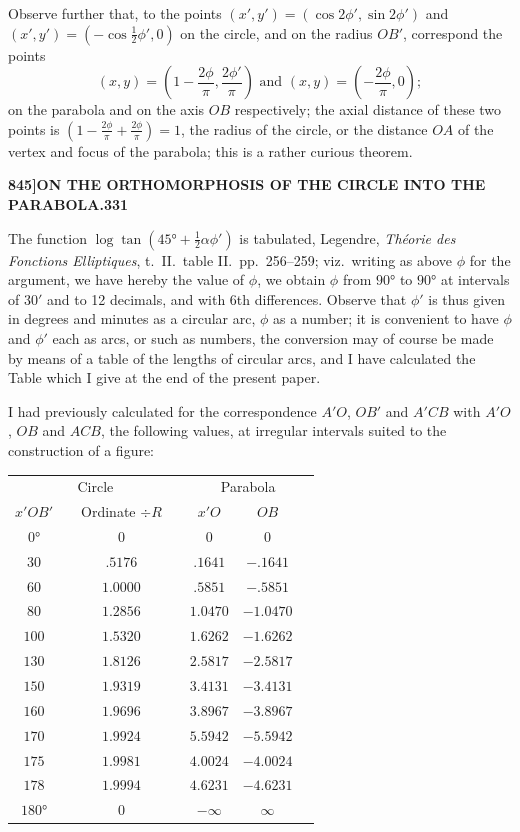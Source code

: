 \documentclass[11pt,a4paper]{book}
\begin{document}
Observe further that, to the points $(x', y') = (\cos 2\phi', \sin 2\phi')$ and $(x', y') = (-\cos\tfrac{1}{2}\phi', 0)$ on the circle, and on the radius $OB'$, correspond the points
\[
(x, y) = \left(1 - \frac{2\phi}{\pi}, \frac{2\phi'}{\pi}\right) \text{ and } (x, y) = \left(-\frac{2\phi}{\pi}, 0\right);
\]
on the parabola and on the axis $OB$ respectively; the axial distance of these two points is $\left(1 - \frac{2\phi}{\pi} + \frac{2\phi}{\pi}\right) = 1$, the radius of the circle, or the distance $OA$ of the vertex and focus of the parabola; this is a rather curious theorem.

\newpage
\setcounter{page}{331}

\noindent\textbf{845]}\hfill\textbf{ON THE ORTHOMORPHOSIS OF THE CIRCLE INTO THE PARABOLA.}\hfill\textbf{331}

\bigskip

\noindent The function $\log\tan(45° + \tfrac{1}{2}\alpha\phi')$ is tabulated, Legendre, \textit{Th\'eorie des Fonctions Elliptiques}, t.\ II.\ table II.\ pp.\ 256--259; viz.\ writing as above $\phi$ for the argument, we have hereby the value of $\phi$, we obtain $\phi$ from $90°$ to $90°$ at intervals of $30'$ and to 12 decimals, and with 6th differences. Observe that $\phi'$ is thus given in degrees and minutes as a circular arc, $\phi$ as a number; it is convenient to have $\phi$ and $\phi'$ each as arcs, or such as numbers, the conversion may of course be made by means of a table of the lengths of circular arcs, and I have calculated the Table which I give at the end of the present paper.

I had previously calculated for the correspondence $A'O$, $OB'$ and $A'CB$ with $A'O$, $OB$ and $ACB$, the following values, at irregular intervals suited to the construction of a figure:

\medskip
\begin{center}
\small
\begin{tabular}{c|c|c|c|c|c|c}
\multicolumn{4}{c|}{Circle} & \multicolumn{3}{c}{Parabola} \\
$x'OB'$ & & Ordinate $\div R$ & & $x'O$ & $OB$ & \\
\hline
$0°$ & & $0$ & & $0$ & $0$ & \\
$30$ & & $.5176$ & & $.1641$ & $-.1641$ & \\
$60$ & & $1.0000$ & & $.5851$ & $-.5851$ & \\
$80$ & & $1.2856$ & & $1.0470$ & $-1.0470$ & \\
$100$ & & $1.5320$ & & $1.6262$ & $-1.6262$ & \\
$130$ & & $1.8126$ & & $2.5817$ & $-2.5817$ & \\
$150$ & & $1.9319$ & & $3.4131$ & $-3.4131$ & \\
$160$ & & $1.9696$ & & $3.8967$ & $-3.8967$ & \\
$170$ & & $1.9924$ & & $5.5942$ & $-5.5942$ & \\
$175$ & & $1.9981$ & & $4.0024$ & $-4.0024$ & \\
$178$ & & $1.9994$ & & $4.6231$ & $-4.6231$ & \\
$180°$ & & $0$ & & $-\infty$ & $\infty$ &
\end{tabular}
\end{center}
\medskip
\end{document}
